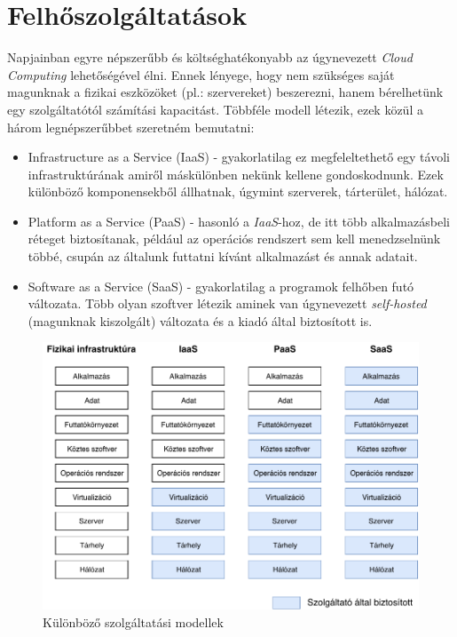 \section{Felhőszolgáltatások}
Napjainban egyre népszerűbb és költséghatékonyabb az úgynevezett \textit{Cloud Computing} lehetőségével élni. Ennek lényege, hogy nem szükséges saját magunknak a fizikai eszközöket (pl.: szervereket) beszerezni, hanem bérelhetünk egy szolgáltatótól számítási kapacitást. Többféle modell létezik, ezek közül a három legnépszerűbbet szeretném bemutatni:
\begin{itemize}
    \item Infrastructure as a Service (IaaS) - gyakorlatilag ez megfeleltethető egy távoli infrastruktúrának amiről máskülönben nekünk kellene gondoskodnunk. Ezek különböző komponensekből állhatnak, úgymint szerverek, tárterület, hálózat.
    \item Platform as a Service (PaaS) - hasonló a \textit{IaaS}-hoz, de itt több alkalmazásbeli réteget biztosítanak, például az operációs rendszert sem kell menedzselnünk többé, csupán az általunk futtatni kívánt alkalmazást és annak adatait.
    \item Software as a Service (SaaS) - gyakorlatilag a programok felhőben futó változata. Több olyan szoftver létezik aminek van úgynevezett \textit{self-hosted} (magunknak kiszolgált) változata és a kiadó által biztosított is.
\end{itemize}
\begin{figure}[ht]
\centering
\includegraphics[width=150mm, keepaspectratio]{img/XaaS.pdf}
\caption{Különböző szolgáltatási modellek}
\end{figure}
\newpage
\vskip 0.1in

